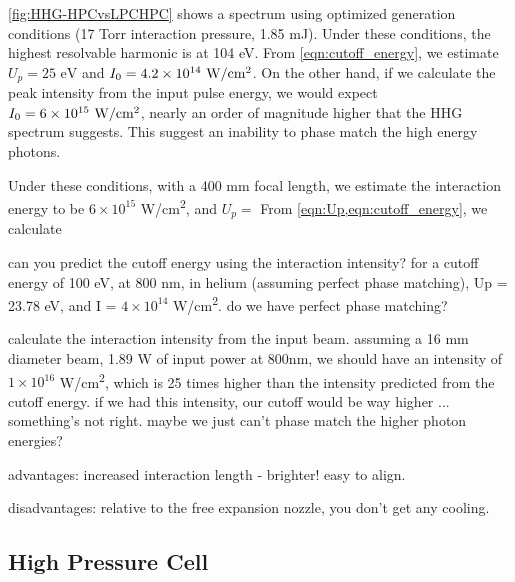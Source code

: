 \cref{fig:HHG-HPCvsLPCHPC} shows a spectrum using optimized generation conditions (17 Torr interaction pressure, 1.85 mJ). Under these conditions, the highest resolvable harmonic is at 104 eV. From \cref{eqn:cutoff_energy}, we estimate $U_p = 25 \textrm{ eV}$ and $I_0 = 4.2 \times 10^{14} \textrm{ W/cm\textsuperscript{2}}$. On the other hand, if we calculate the peak intensity from the input pulse energy, we would expect $I_0 = 6 \times 10^{15} \textrm{ W/cm\textsuperscript{2}}$, nearly an order of magnitude higher that the HHG spectrum suggests. This suggest an inability to phase match the high energy photons.

Under these conditions, with a 400 mm focal length, we estimate the interaction energy to be $6 \times 10^{15}$ W/cm\textsuperscript{2}, and $U_p = $ From \cref{eqn:Up,eqn:cutoff_energy}, we calculate 




can you predict the cutoff energy using the interaction intensity? for a cutoff energy of 100 eV, at 800 nm, in helium (assuming perfect phase matching), Up = 23.78 eV, and I = $4 \times 10^{14}$ W/cm\textsuperscript{2}. do we have perfect phase matching?

calculate the interaction intensity from the input beam. assuming a 16 mm diameter beam, 1.89 W of input power at 800nm, we should have an intensity of $1 \times 10^{16}$ W/cm\textsuperscript{2}, which is 25 times higher than the intensity predicted from the cutoff energy. if we had this intensity, our cutoff would be way higher ... something's not right. maybe we just can't phase match the higher photon energies? 



advantages: increased interaction length - brighter! easy to align.

disadvantages: relative to the free expansion nozzle, you don't get any cooling.

\subsection{High Pressure Cell}
\label{sec:HPC}

